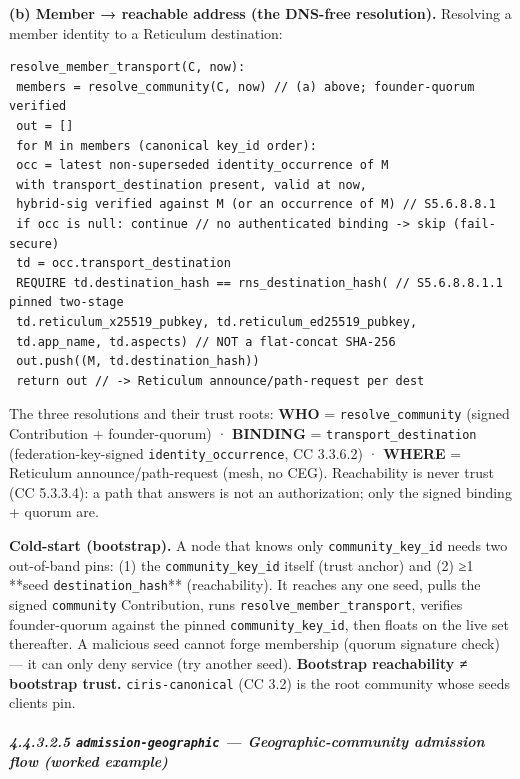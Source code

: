 \documentclass[11pt]{article}
\begin{document}
\textbf{(b) Member → reachable address (the DNS-free resolution).} Resolving a member identity to a Reticulum destination:


\begin{lstlisting}
resolve_member_transport(C, now):
 members = resolve_community(C, now) // (a) above; founder-quorum verified
 out = []
 for M in members (canonical key_id order):
 occ = latest non-superseded identity_occurrence of M
 with transport_destination present, valid at now,
 hybrid-sig verified against M (or an occurrence of M) // S5.6.8.8.1
 if occ is null: continue // no authenticated binding -> skip (fail-secure)
 td = occ.transport_destination
 REQUIRE td.destination_hash == rns_destination_hash( // S5.6.8.8.1.1 pinned two-stage
 td.reticulum_x25519_pubkey, td.reticulum_ed25519_pubkey,
 td.app_name, td.aspects) // NOT a flat-concat SHA-256
 out.push((M, td.destination_hash))
 return out // -> Reticulum announce/path-request per dest
\end{lstlisting}

The three resolutions and their trust roots: \textbf{WHO} = \texttt{resolve\_community} (signed Contribution + founder-quorum) · \textbf{BINDING} = \texttt{transport\_destination} (federation-key-signed \texttt{identity\_occurrence}, CC 3.3.6.2) · \textbf{WHERE} = Reticulum announce/path-request (mesh, no CEG). Reachability is never trust (CC 5.3.3.4): a path that answers is not an authorization; only the signed binding + quorum are.


\textbf{Cold-start (bootstrap).} A node that knows only \texttt{community\_key\_id} needs two out-of-band pins: (1) the \texttt{community\_key\_id} itself (trust anchor) and (2) ≥1 **seed \texttt{destination\_hash}** (reachability). It reaches any one seed, pulls the signed \texttt{community} Contribution, runs \texttt{resolve\_member\_transport}, verifies founder-quorum against the pinned \texttt{community\_key\_id}, then floats on the live set thereafter. A malicious seed cannot forge membership (quorum signature check) — it can only deny service (try another seed). \textbf{Bootstrap reachability ≠ bootstrap trust.} \texttt{ciris-canonical} (CC 3.2) is the root community whose seeds clients pin.


\subparagraph{4.4.3.2.5 \texttt{admission-geographic} — Geographic-community admission flow (worked example)}\mbox{}\\
\end{document}
